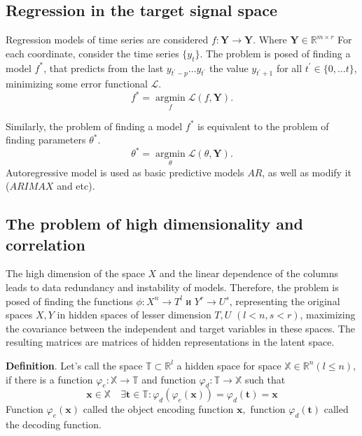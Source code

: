 \documentclass{article}
\newcommand{\argmin}{\mathop{\arg \min}\limits}
\begin{document}
\subsection{Regression in the target signal space}
Regression models of time series are considered $f : \mathbf{Y} \rightarrow \mathbf{Y}$. Where $\mathbf{Y} \in  \mathbb{R}^{m \times r}$ For each coordinate, consider the time series $\{y_t\}$. The problem is posed of finding a model $f^*$, that predicts from the last $y_{t^{'}-p} \dots y_{t^{'}}$ the value $y_{t^{'}+1}$ for all $t^{'} \in \{0, \dots t\}$, minimizing some error functional $ \mathcal{L}$.
\begin{equation}\label{eq3} 
	f^* = \argmin_f \mathcal{L}(f, \mathbf{Y}).
\end{equation}

Similarly, the problem of finding a model $f^*$ is equivalent to the problem of finding parameters $\theta^*$.
\begin{equation}\label{eq4} 
\theta^* = \argmin_{\theta} \mathcal{L}(\theta, \mathbf{Y}).
\end{equation}
Autoregressive model is used as basic predictive models $AR$, as well as modify it ($ARIMAX$ \cite{7514029} and etc).
\subsection{The problem of high dimensionality and correlation}
The high dimension of the space $ X $ and the linear dependence of the columns leads to data redundancy and instability of models. Therefore, the problem is posed of finding the functions $\phi: X^n \rightarrow T^l$ и  $Y^r \rightarrow U^s$, representing the original spaces $X, Y$ in hidden spaces of lesser dimension $T, U$ $(l < n, s < r)$, maximizing the covariance between the independent and target variables in these spaces. The resulting matrices are matrices of hidden representations in the latent space.

\textbf{Definition}. Let's call the space $\mathbb{T} \subset \mathbb{R}^{l}$ a hidden space for space $\mathbb{X} \in \mathbb{R}^{n}(l \leqslant n),$ if there is a function $\varphi_{e}: \mathbb{X} \rightarrow \mathbb{T}$ and function $\varphi_{d}: \mathbb{T} \rightarrow \mathbb{X}$ such that
$$
\mathbf{x} \in \mathbb{X} \quad \exists \mathbf{t} \in \mathbb{T}: \varphi_{d}\left(\varphi_{e}(\mathbf{x})\right)=\varphi_{d}(\mathbf{t})=\mathbf{x}
$$
Function $\varphi_{e}(\mathbf{x})$ called the object encoding function $\mathbf{x},$ function $\varphi_{d}(\mathbf{t})$
called the decoding function.
\end{document}
